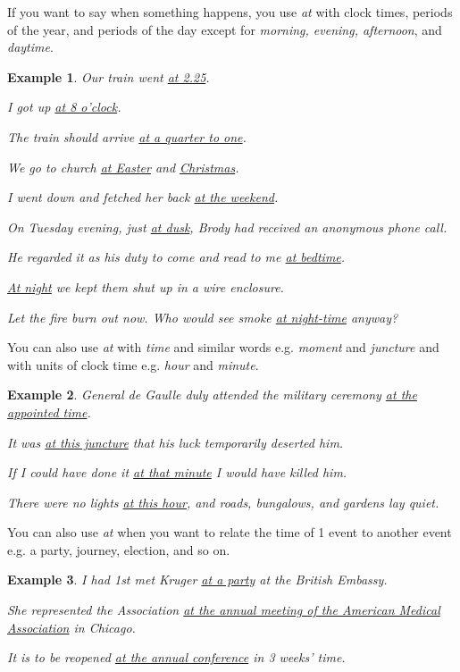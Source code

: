 \documentclass[oneside]{book}
\numberwithin{equation}{section}
\newtheorem{example}{Example}[section]
\begin{document}
%
\noindent{} If you want to say when something happens, you use \textit{at} with clock times, periods of the year, and periods of the day except for \textit{morning, evening, afternoon}, and \textit{daytime}.
\begin{example}
    Our train went \underline{at 2.25}.
    
    I got up \underline{at 8 o'clock}.
    
    The train should arrive \underline{at a quarter to one}.
    
    We go to church \underline{at Easter} and \underline{Christmas}.
    
    I went down and fetched her back \underline{at the weekend}.
    
    On Tuesday evening, just \underline{at dusk}, Brody had received an anonymous phone call.
    
    He regarded it as his duty to come and read to me \underline{at bedtime}.
    
    \underline{At night} we kept them shut up in a wire enclosure.
    
    Let the fire burn out now. Who would see smoke \underline{at night-time} anyway?
\end{example}
You can also use \textit{at} with \textit{time} and similar words e.g. \textit{moment} and \textit{juncture} and with units of clock time e.g. \textit{hour} and \textit{minute}.
\begin{example}
    General de Gaulle duly attended the military ceremony \underline{at the appointed time}.
    
    It was \underline{at this juncture} that his luck temporarily deserted him.
    
    If I could have done it \underline{at that minute} I would have killed him.
    
    There were no lights \underline{at this hour}, and roads, bungalows, and gardens lay quiet.
\end{example}
%
\noindent{} You can also use \textit{at} when you want to relate the time of 1 event to another event e.g. a party, journey, election, and so on.
\begin{example}
    I had 1st met Kruger \underline{at a party} at the British Embassy.
    
    She represented the Association \underline{at the annual meeting of the American Medical Association} in Chicago.
    
    It is to be reopened \underline{at the annual conference} in 3 weeks' time.
\end{example}
\end{document}
